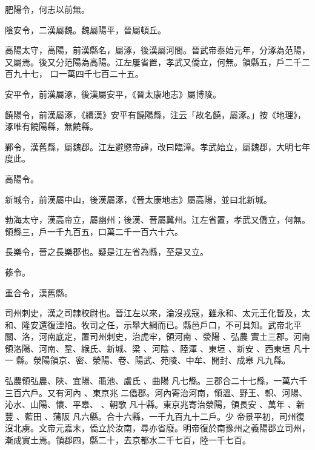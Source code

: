 \begin{pinyinscope}
 肥陽令，何志以前無。



 陰安令，二漢屬魏。魏屬陽平，晉屬頓丘。



 高陽太守，高陽，前漢縣名，屬涿，後漢屬河間。晉武帝泰始元年，分涿為范陽，又屬焉。後又分范陽為高陽。江左屢省置，孝武又僑立，何無。領縣五，戶二千二百九十七，
 口一萬四千七百二十五。



 安平令，前漢屬涿，後漢屬安平，《晉太康地志》屬博陵。



 饒陽令，前漢屬涿，《續漢》安平有饒陽縣，注云「故名饒，屬涿。」按《地理》，涿唯有饒陽縣，無饒縣。



 鄴令，漢舊縣，屬魏郡。江左避愍帝諱，改曰臨漳。孝武始立，屬魏郡，大明七年度此。


高陽令。



 新城令，前漢屬中山，後漢屬涿，《晉太康地志》屬高陽，並曰北新城。



 勃海太守，漢高帝立，屬幽州；後漢、晉屬冀州。江左省置，孝武又僑立，何無。領縣三，戶一千九百五，口萬二千一百六十六。



 長樂令，晉之長樂郡也。疑是江左省為縣，至是又立。


蓚令。



 重合令，漢舊縣。


司州刺史，漢之司隸校尉也。晉江左以來，淪沒戎寇，雖永和、太元王化暫及，太和、隆安還復湮陷。牧司之任，示舉大綱而已。縣邑戶口，不可具知。武帝北平關、洛，河南底定，置司州刺史，治虎牢，領河南
 、滎陽
 、弘農
 實土三郡。河南領洛陽、河南、鞏、緱氏、新城、梁
 、河陰
 、陸渾
 、東垣
 、新安
 、西東垣
 凡十一
 縣。滎陽領京、密、滎陽、卷、陽武、苑陵、中牟、開封、成皋
 凡九縣。


弘農領弘農、陜、宜陽、黽池、盧氏
 、曲陽
 凡七縣。三郡合二十七縣，一萬六千三百六戶。又有河內
 、東京兆
 二僑郡。河內寄治河南，領溫、野王、軹、河陽、沁水、山陽、懷、平皋、
 、朝歌
 凡十縣。東京兆寄治滎陽，領長安
 、萬年
 、新豐
 、藍田
 、蒲阪
 凡六縣。合十六縣，一千九百九十二戶。少
 帝景平初，司州復沒北虜。文帝元嘉末，僑立於汝南，尋亦省廢。明帝復於南豫州之義陽郡立司州，漸成實土焉。領郡四，縣二十，去京都水二千七百，陸一千七百。




\end{pinyinscope}
